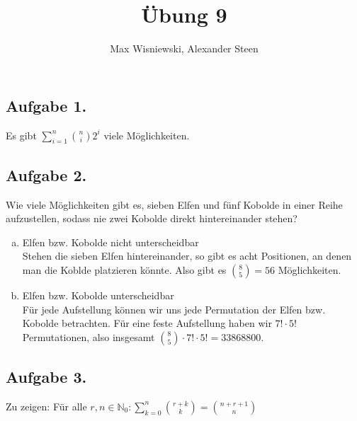 \documentclass[11pt,a4paper,ngerman]{article}
\date{}
\title{Übung 9}
\author{Max Wisniewski, Alexander Steen}
\begin{document}

\renewcommand{\figurename}{Figure}

\maketitle
\thispagestyle{fancy}

\subsection*{Aufgabe 1.}
Es gibt $\sum_{i=1}^n \binom{n}{i} 2^i$ viele Möglichkeiten.

\subsection*{Aufgabe 2.}
Wie viele Möglichkeiten gibt es, sieben Elfen und fünf Kobolde in einer Reihe aufzustellen,
sodass nie zwei Kobolde direkt hintereinander stehen?
\begin{enumerate}[a)]
\item Elfen bzw. Kobolde nicht unterscheidbar \\
    Stehen die sieben Elfen hintereinander, so gibt es acht Positionen, an denen man die Koblde
    platzieren könnte. Also gibt es $\binom{8}{5} = 56$ Möglichkeiten.
\item Elfen bzw. Kobolde unterscheidbar \\
    Für jede Aufstellung können wir uns jede Permutation der Elfen bzw. Kobolde betrachten. Für eine
    feste Aufstellung haben wir $7! \cdot 5!$ Permutationen, also insgesamt
    $\binom{8}{5} \cdot 7! \cdot 5! = 33 868 800$.
\end{enumerate}

\subsection*{Aufgabe 3.}
Zu zeigen: Für alle $r,n \in \mathbb{N}_0: \sum_{k=0}^n \binom{r+k}{k} = \binom{n+r+1}{n}$
\end{document}
